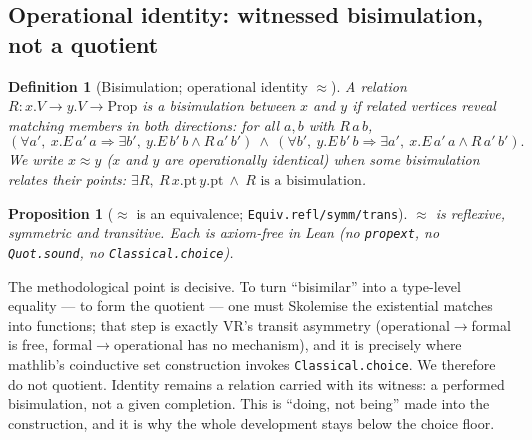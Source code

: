 \documentclass[11pt]{article}
\newtheorem{defn}[thm]{Definition}
\newtheorem{prop}[thm]{Proposition}
\theoremstyle{remark}
\newcommand{\eq}{\approx}
\begin{document}
\subsection{Operational identity: witnessed bisimulation, not a quotient}
\begin{defn}[Bisimulation; operational identity $\eq$]
A relation $R:x.V\to y.V\to\mathrm{Prop}$ is a bisimulation between $x$ and $y$ if related vertices
reveal matching members in both directions: for all $a,b$ with $R\,a\,b$,
\[
(\forall a',\ x.E\,a'\,a \Rightarrow \exists b',\ y.E\,b'\,b \wedge R\,a'\,b')\ \wedge\
(\forall b',\ y.E\,b'\,b \Rightarrow \exists a',\ x.E\,a'\,a \wedge R\,a'\,b').
\]
We write $x\eq y$ ($x$ and $y$ are operationally identical) when some bisimulation relates their
points: $\exists R,\ R\,x.\mathrm{pt}\,y.\mathrm{pt}\ \wedge\ R\text{ is a bisimulation}$.
\end{defn}
\begin{prop}[$\eq$ is an equivalence; \texttt{Equiv.refl/symm/trans}]
$\eq$ is reflexive, symmetric and transitive. Each is axiom-free in Lean (no \texttt{propext}, no
\texttt{Quot.sound}, no \texttt{Classical.choice}).
\end{prop}
The methodological point is decisive. To turn ``bisimilar'' into a type-level equality --- to form
the quotient --- one must Skolemise the existential matches into functions; that step is exactly VR's
transit asymmetry (operational$\to$formal is free, formal$\to$operational has no mechanism), and it
is precisely where mathlib's coinductive set construction invokes \texttt{Classical.choice}. We
therefore do not quotient. Identity remains a relation carried with its witness: a performed
bisimulation, not a given completion. This is ``doing, not being'' made into the construction, and
it is why the whole development stays below the choice floor.
\end{document}
